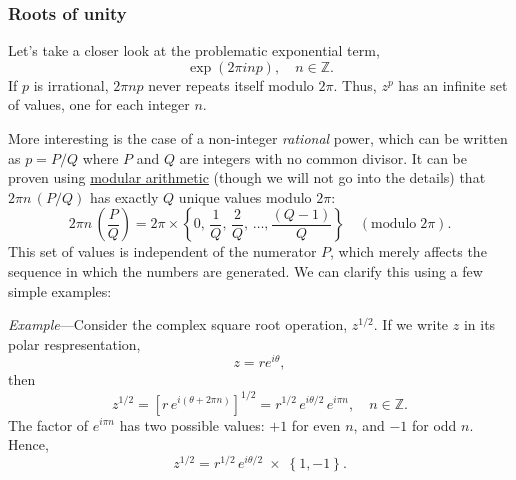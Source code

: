 \documentclass[10pt,a4paper]{article}
\begin{document}
\subsubsection{Roots of unity}\label{roots-of-unity}

Let's take a closer look at the problematic exponential term,
\begin{equation}
\exp\left(2\pi i np\right), \quad n \in \mathbb{Z}.
\end{equation}
If $p$ is irrational, $2\pi np$ never repeats itself modulo $2\pi$.
Thus, $z^p$ has an infinite set of values, one for each integer $n$.

More interesting is the case of a non-integer \emph{rational} power,
which can be written as $p = P/Q$ where $P$ and $Q$ are integers with
no common divisor.  It can be proven using
\href{https://en.wikipedia.org/wiki/Modular_arithmetic}{modular
  arithmetic} (though we will not go into the details) that $2\pi n\,
(P/Q)$ has exactly $Q$ unique values modulo $2\pi$:
\begin{equation}
 2\pi n\, \left(\frac{P}{Q}\right) = 2\pi \times \left\{0,\, \frac{1}{Q},\, \frac{2}{Q},\, \dots, \frac{(Q-1)}{Q} \right\} \quad(\mathrm{modulo} \; 2\pi).
\end{equation}
This set of values is independent of the numerator $P$, which merely
affects the sequence in which the numbers are generated. We can
clarify this using a few simple examples:

\begin{framed} \noindent
\textit{Example}---Consider the complex square root operation,
$z^{1/2}$. If we write $z$ in its polar respresentation,
\begin{equation}
  z = r e^{i\theta},
\end{equation}
then
\begin{equation}
  z^{1/2} = \left[r \, e^{i(\theta + 2 \pi n)} \right]^{1/2} = r^{1/2} \, e^{i\theta/2} \, e^{i \pi n}, \quad n \in \mathbb{Z}.
\end{equation}
The factor of $e^{i\pi n}$ has two possible values: $+1$ for even
$n$, and $-1$ for odd $n$. Hence,
\begin{equation}
  z^{1/2} = r^{1/2} \, e^{i\theta/2} \;\times\; \left\{1, -1\right\}.
\end{equation}
\end{framed}
\end{document}
